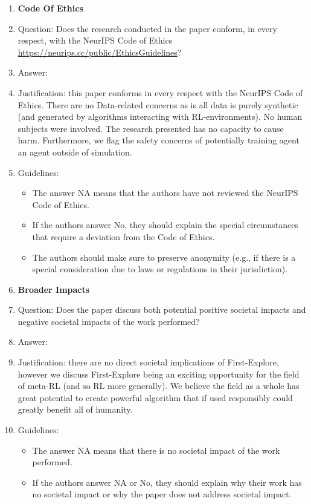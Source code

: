 \documentclass{article}
\begin{document}
\begin{enumerate}
\begin{itemize}
    \end{itemize}
\item {\bf Code Of Ethics}
    \item[] Question: Does the research conducted in the paper conform, in every respect, with the NeurIPS Code of Ethics \url{https://neurips.cc/public/EthicsGuidelines}?
    \item[] Answer: \answerYes{}
    \item[] Justification: this paper conforms in every respect with the NeurIPS Code of Ethics. There are no Data-related concerns as is all data is purely synthetic (and generated by algorithms interacting with RL-environments). No human subjects were involved. The research presented has no capacity to cause harm. Furthermore, we flag the safety concerns of potentially training agent an agent outside of simulation.
    \item[] Guidelines:
    \begin{itemize}
        \item The answer NA means that the authors have not reviewed the NeurIPS Code of Ethics.
        \item If the authors answer No, they should explain the special circumstances that require a deviation from the Code of Ethics.
        \item The authors should make sure to preserve anonymity (e.g., if there is a special consideration due to laws or regulations in their jurisdiction).
    \end{itemize}
\item {\bf Broader Impacts}
    \item[] Question: Does the paper discuss both potential positive societal impacts and negative societal impacts of the work performed?
    \item[] Answer: \answerNA{}
    \item[] Justification: there are no direct societal implications of First-Explore, however we discuss First-Explore being an exciting opportunity for the field of meta-RL (and so RL more generally). We believe the field as a whole has great potential to create powerful algorithm that if used responsibly could greatly benefit all of humanity.
    \item[] Guidelines:
    \begin{itemize}
        \item The answer NA means that there is no societal impact of the work performed.
        \item If the authors answer NA or No, they should explain why their work has no societal impact or why the paper does not address societal impact.

\end{itemize}
\end{enumerate}
\end{document}
